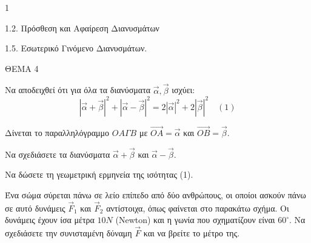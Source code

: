 \begin{ylh}{1}
    \item 1.2. Πρόσθεση και Αφαίρεση Διανυσμάτων
    \item 1.5. Εσωτερικό Γινόμενο Διανυσμάτων.
\end{ylh}
\begin{figure}
    \centering
\end{figure}
ΘΕΜΑ 4

\begin{alist}
    \item Να αποδειχθεί ότι για όλα τα διανύσματα $\vec{\alpha}, \vec{\beta}$ ισχύει:
    \[ |\vec{\alpha} + \vec{\beta}|^2 + |\vec{\alpha} - \vec{\beta}|^2 = 2|\vec{\alpha}|^2 + 2|\vec{\beta}|^2 \quad (1) \] 

    \item Δίνεται το παραλληλόγραμμο $OΑΓΒ$ με $\vec{OA} = \vec{\alpha}$ και $\vec{OB} = \vec{\beta}$.
    \begin{rlist}
        \item Να σχεδιάσετε τα διανύσματα $\vec{\alpha} + \vec{\beta}$ και $\vec{\alpha} - \vec{\beta}$. 
        \item Να δώσετε τη γεωμετρική ερμηνεία της ισότητας (1). 
    \end{rlist}

    \item Ένα σώμα σύρεται πάνω σε λείο επίπεδο από δύο ανθρώπους, οι οποίοι ασκούν πάνω σε αυτό δυνάμεις $\vec{F}_1$ και $\vec{F}_2$ αντίστοιχα, όπως φαίνεται στο παρακάτω σχήμα. Οι δυνάμεις έχουν ίσα μέτρα $10 N$ (Newton) και η γωνία που σχηματίζουν είναι $60^\circ$. Να σχεδιάσετε την συνισταμένη δύναμη $\vec{F}$ και να βρείτε το μέτρο της. 
\end{alist}